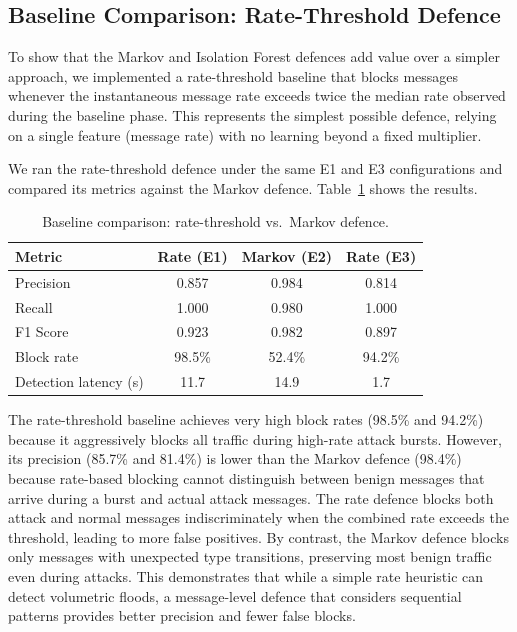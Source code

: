 \subsection{Baseline Comparison: Rate-Threshold Defence}

To show that the Markov and Isolation Forest defences add value over a simpler approach, we implemented a rate-threshold baseline that blocks messages whenever the instantaneous message rate exceeds twice the median rate observed during the baseline phase.
This represents the simplest possible defence, relying on a single feature (message rate) with no learning beyond a fixed multiplier.

We ran the rate-threshold defence under the same E1 and E3 configurations and compared its metrics against the Markov defence.
Table~\ref{tab:baseline_comparison} shows the results.

\begin{table}[t]
\centering
\caption{Baseline comparison: rate-threshold vs.\ Markov defence.}
\label{tab:baseline_comparison}
\renewcommand{\arraystretch}{1.15}
\begin{tabular}{lccc}
\toprule
\textbf{Metric} & \textbf{Rate (E1)} & \textbf{Markov (E2)} & \textbf{Rate (E3)} \\
\midrule
Precision & 0.857 & 0.984 & 0.814 \\
Recall & 1.000 & 0.980 & 1.000 \\
F1 Score & 0.923 & 0.982 & 0.897 \\
Block rate & 98.5\% & 52.4\% & 94.2\% \\
Detection latency (s) & 11.7 & 14.9 & 1.7 \\
\bottomrule
\end{tabular}
\end{table}

The rate-threshold baseline achieves very high block rates (98.5\% and 94.2\%) because it aggressively blocks all traffic during high-rate attack bursts.
However, its precision (85.7\% and 81.4\%) is lower than the Markov defence (98.4\%) because rate-based blocking cannot distinguish between benign messages that arrive during a burst and actual attack messages.
The rate defence blocks both attack and normal messages indiscriminately when the combined rate exceeds the threshold, leading to more false positives.
By contrast, the Markov defence blocks only messages with unexpected type transitions, preserving most benign traffic even during attacks.
This demonstrates that while a simple rate heuristic can detect volumetric floods, a message-level defence that considers sequential patterns provides better precision and fewer false blocks.

